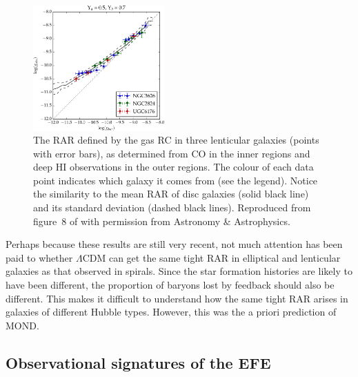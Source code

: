 \documentclass[fleqn,usenatbib,useAMS]{mnras} %
\begin{document}
\begin{figure}
	\centering
	\includegraphics[width=0.45\textwidth]{Shelest_2020_Figure_8_AUTHOR}
	\caption{The RAR defined by the gas RC in three lenticular galaxies (points with error bars), as determined from CO in the inner regions and deep HI observations in the outer regions. The colour of each data point indicates which galaxy it comes from (see the legend). Notice the similarity to the mean RAR of disc galaxies (solid black line) and its standard deviation (dashed black lines). Reproduced from figure~8 of \citet{Shelest_2020} with permission from Astronomy \& Astrophysics.}
	\label{Shelest_2020_Figure_8}
\end{figure}

Perhaps because these results are still very recent, not much attention has been paid to whether $\Lambda$CDM can get the same tight RAR in elliptical and lenticular galaxies as that observed in spirals. Since the star formation histories are likely to have been different, the proportion of baryons lost by feedback should also be different. This makes it difficult to understand how the same tight RAR arises in galaxies of different Hubble types. However, this was the a priori prediction of MOND.



\subsection{Observational signatures of the EFE}
\label{EFE_observations}

\end{document}
